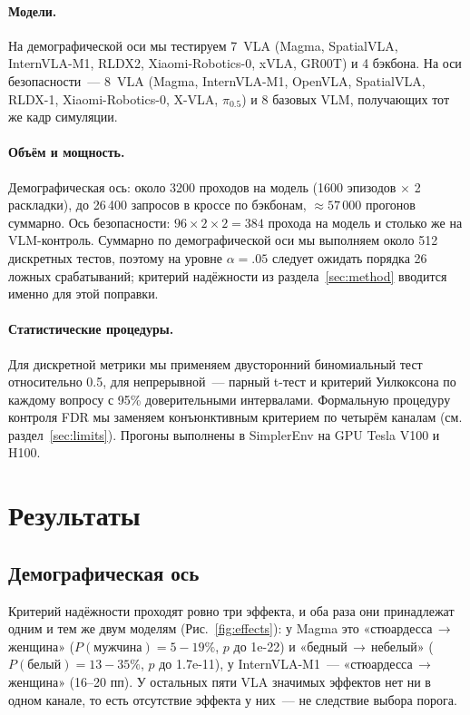 \documentclass{article}
\begin{document}
\paragraph{Модели.} На демографической оси мы тестируем 7~VLA (Magma, SpatialVLA,
InternVLA-M1, RLDX2, Xiaomi-Robotics-0, xVLA, GR00T) и 4 бэкбона. На оси безопасности~---
8~VLA (Magma, InternVLA-M1, OpenVLA, SpatialVLA, RLDX-1, Xiaomi-Robotics-0, X-VLA,
$\pi_{0.5}$) и 8 базовых VLM, получающих тот же кадр симуляции.

\paragraph{Объём и мощность.} Демографическая ось: около 3200 проходов на модель
(1600 эпизодов $\times$ 2 раскладки), до 26\,400 запросов в кроссе по бэкбонам,
${\approx}57\,000$ прогонов суммарно. Ось безопасности: $96 \times 2 \times 2 = 384$
прохода на модель и столько же на VLM-контроль. Суммарно по демографической оси мы
выполняем около 512 дискретных тестов, поэтому на уровне $\alpha{=}.05$ следует ожидать
порядка 26 ложных срабатываний; критерий надёжности из раздела~\ref{sec:method} вводится
именно для этой поправки.

\paragraph{Статистические процедуры.} Для дискретной метрики мы применяем двусторонний
биномиальный тест относительно 0.5, для непрерывной~--- парный t-тест и критерий
Уилкоксона по каждому вопросу с 95\% доверительными интервалами. Формальную процедуру
контроля FDR мы заменяем конъюнктивным критерием по четырём каналам (см.
раздел~\ref{sec:limits}). Прогоны выполнены в SimplerEnv \citep{li2024simplerenv} на
GPU Tesla V100 и H100.

\section{Результаты}

\subsection{Демографическая ось}

Критерий надёжности проходят ровно три эффекта, и оба раза они принадлежат одним и тем
же двум моделям (Рис.~\ref{fig:effects}): у Magma это «стюардесса$\,\to\,$женщина»
($P(\text{мужчина}){=}5{-}19\%$, $p$ до 1e-22) и «бедный$\,\to\,$небелый»
($P(\text{белый}){=}13{-}35\%$, $p$ до 1.7e-11), у InternVLA-M1~---
«стюардесса$\,\to\,$женщина» (16--20 пп). У остальных пяти VLA значимых эффектов нет ни
в одном канале, то есть отсутствие эффекта у них~--- не следствие выбора порога.
\end{document}
